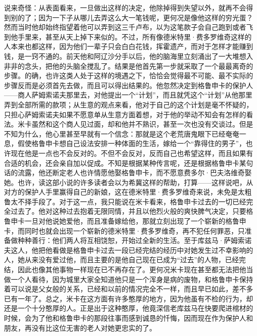 \par 说来奇怪：从表面看来，一旦做出这样的决定，他除掉得到失望以外，就再不会得到别的了；因为一下子从哪儿去弄这么大一笔钱呢，更何况是像他这样的穷光蛋？然而当时他却始终指望着他可以弄到这三千卢布，以为这笔款子会自己跑到或者飞到他手里来，甚至从天上掉下来似的。不过，所有像德米特里·费多罗维奇这样的人本来也都这样，因为他们一辈子只会白白花钱，挥霍遗产，而对于怎样才能赚到钱，是一窍不通的。前天他和阿辽沙分手以后，他的脑海里立刻涌出了一大堆想入非非的念头，把他的头脑全搅乱了。结果是他首先第一步就采取了一个最最离奇的步骤。的确，也许这类人处于这样的境遇之下，恰恰会觉得最不可能、最不实际的步骤反而是必须首先去做，而且可以得出结果的。他忽然决定到格鲁申卡的保护人——商人萨姆索诺夫那里去，对他提出一个“计划”，而且就凭这个“计划”从他那里弄到全部所需的款项；从生意的观点来看，他对于自己的这个计划是毫不怀疑的，只担心萨姆索诺夫如果不愿意单从生意方面着想，对于他的举动不知会有怎样的看法。米卡虽然和这个商人见过面，却和他并不熟识，甚至一次也没有交谈过。但是不知为什么，他心里甚至早就有一个信念：那就是这个老荒唐鬼眼下已经奄奄一息，假使格鲁申卡想自己设法安排一种体面的生活，嫁给一个“靠得住的男子”，也许现在他是一点也不会反对的。不但不会反对，反而自己也希望这样，而且如果有合适的机会，还会亲自加以促成。不知是根据某种传言呢，还是根据格鲁申卡某句话的流露，他还断定老人也许情愿他娶格鲁申卡，而不愿意费多尔·巴夫洛维奇娶她。也许，读这部小说的许多读者会以为希冀这样的帮助，打算——这样说吧，从对方的保护人手里赢得自己的新娘，这在德米特里·费多罗维奇来说，未免是太粗鲁太不择手段了。对于这一点，我只能说在米卡看来，格鲁申卡过去的一切已经完全过去了。他对这种过去抱着无限同情，并且以他烈火般的爽快脾气决定，只要格鲁申卡一旦对他说她爱他，而且准备嫁给他，那就立刻出现了一个崭新的格鲁申卡，而同时也就会出现一个崭新的德米特里·费多罗维奇，再不犯任何罪恶，只准备做种种善行：他们两人将互相饶恕，开始过全新的生活。至于库兹马·萨姆索诺夫这人，他把他看做是格鲁申卡过去一段已经完结的经历中对她发生过不幸影响的人，她从来没有爱过他，而且主要的是他自己现在已成为“过去”的人物，已经完结，因此也像其他事物一样现在已不再存在了。更何况米卡现在甚至都无法把他当做一个人看待，因为城里大家全知道他只是一个浑身是病的废物，和格鲁申卡保持着可以说是父女般的关系，已经和以前的情况完全不一样，而且早已如此，差不多已有一年了。总之，米卡在这方面有许多憨厚的地方，因为他虽有不检的行为，却还是一个十分憨厚的人。正是出于这种憨厚，他竟深信老库兹马在快要爬进棺材的时候，会为了他和格鲁申卡的那段往事而感到诚恳的忏悔，因而现在作为保护人和朋友，再没有比这位无害的老人对她更忠实的了。
